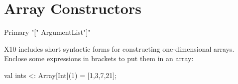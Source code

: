 
\section{Array Constructors}
\label{sect:ArrayCtors}


\begin{bbgrammar}
             Primary \: 
                    \xcd"[" ArgumentList\opt \xcd"]" 
\end{bbgrammar}

X10 includes short syntactic forms for constructing one-dimensional arrays.
Enclose some expressions in brackets to put them in an array: 
\begin{xten}
val ints <: Array[Int](1) = [1,3,7,21];
\end{xten}

